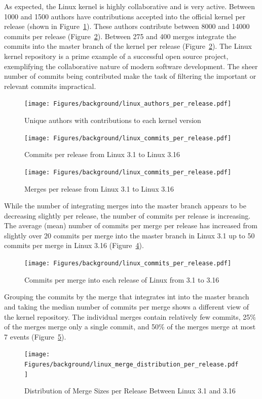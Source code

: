 As expected, the Linux kernel is highly collaborative and is very
active. Between 1000 and 1500 authors have contributions accepted into
the official kernel per release (shown in
Figure~\ref{fig:linux_authors_per_release}). These authors contribute
between 8000 and 14000 commits per release
(Figure~\ref{fig:linux_commits_per_release}). Between 275 and 400 merges
integrate the commits into the master branch of the kernel per release
(Figure~\ref{fig:linux_commits_per_release}). The Linux kernel
repository is a prime example of a successful open source project,
exemplifying the collaborative nature of modern software development.
The sheer number of commits being contributed make the task of filtering
the important or relevant commits impractical.

\begin{figure}[htpb]
  \centering
  \texttt{[image: Figures/background/linux\_authors\_per\_release.pdf]}
  \caption{Unique authors with contributions to each kernel version}
  \label{fig:linux_authors_per_release}
\end{figure}

\begin{figure}[htpb]
  \centering
  \texttt{[image: Figures/background/linux\_commits\_per\_release.pdf]}
  \caption{Commits per release from Linux 3.1 to Linux 3.16}
  \label{fig:linux_commits_per_release}
\end{figure}

\begin{figure}[htpb]
  \centering
  \texttt{[image: Figures/background/linux\_commits\_per\_release.pdf]}
  \caption{Merges per release from Linux 3.1 to Linux 3.16}
  \label{fig:linux_merges_per_release}
\end{figure}

While the number of integrating merges into the master branch appears to
be decreasing slightly per release, the number of commits per release is
increasing.
The average (mean) number of commits per merge per release has
increased from slightly over 20 commits per merge into the master branch
in Linux 3.1 up to 50 commits per merge in Linux 3.16
(Figure~\ref{fig:linux_commits_per_merge_per_release}).

\begin{figure}[htpb]
  \centering
  \texttt{[image: Figures/background/linux\_commits\_per\_release.pdf]}
  \caption{Commits per merge into each release of Linux from 3.1 to 3.16}
  \label{fig:linux_commits_per_merge_per_release}
\end{figure}

Grouping the commits by the merge that integrates int into the master
branch and taking the median number of commits per merge shows a
different view of the kernel repository.
The individual merges contain
relatively few commits, 25\% of the merges merge only a single commit,
and 50\% of the merges merge at most 7 events
(Figure~\ref{fig:linux_merge_distribution_per_release}).

\begin{figure}[htpb]
  \centering
  \texttt{[image: Figures/background/linux\_merge\_distribution\_per\_release.pdf]}
  \caption{Distribution of Merge Sizes per Release Between Linux 3.1 and
  3.16}
  \label{fig:linux_merge_distribution_per_release}
\end{figure}
